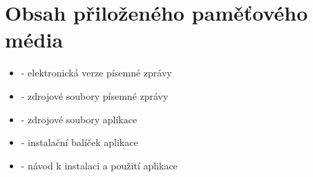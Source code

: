 
\chapter{Obsah přiloženého paměťového média}
    \begin{itemize}
        \item {} - elektronická verze písemné zprávy
        \item {} - zdrojové soubory písemné zprávy
        \item {} - zdrojové soubory aplikace
        \item {} - instalační balíček aplikace
        \item {} - návod k instalaci a použití aplikace
    \end{itemize}



